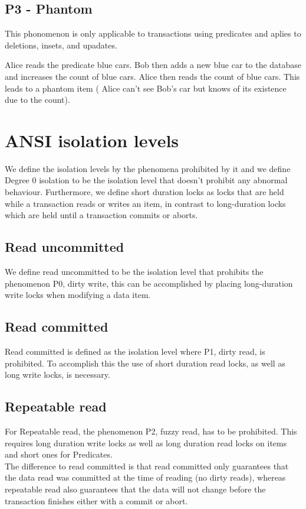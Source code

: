 \documentclass[sigconf, review=true]{acmart}
\begin{document}
\subsection{P3 - Phantom}

This phonomenon is only applicable to transactions using predicates and aplies to deletions, insets, and upadates.
\begin{example}
    Alice reads the predicate blue cars. Bob then adds a new blue car to the database and increases
    the count of blue cars. Alice then reads the count of blue cars. This leads to a phantom item
    ( Alice can’t see Bob's car but knows of its existence due to the count).
\end{example}

\section{ANSI isolation levels}
We define the isolation levels by the phenomena prohibited by it and we define
Degree 0 isolation to be the isolation level that doesn’t prohibit any abnormal
behaviour. Furthermore, we define short duration locks as locks that are held
while a transaction reads or writes an item, in contrast to long-duration locks which are
held until a transaction commits or aborts.

\subsection{Read uncommitted}
We define read uncommitted to be the isolation level that prohibits the phenomenon
P0, dirty write, this can be accomplished by placing long-duration write locks when modifying a data item.

\subsection{Read committed}
Read committed is defined as the isolation level where P1, dirty read, is prohibited.
To accomplish this the use of short duration read locks, as well as long write locks,  is
necessary.

\subsection{Repeatable read}
For Repeatable read, the phenomenon P2, fuzzy read, has to be prohibited.
This requires long duration write locks as well as long duration read locks on
items and short ones for Predicates.\\
The difference to read committed is that read committed only guarantees that
the data read was committed at the time of reading (no dirty reads), whereas
repeatable read also guarantees that the data will not change before the
transaction finishes either with a commit or abort.
\end{document}
